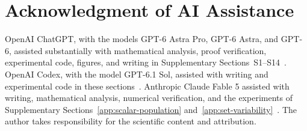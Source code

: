 \section*{Acknowledgment of AI Assistance}
OpenAI ChatGPT, with the models GPT-6 Astra Pro, GPT-6 Astra, and GPT-6,
assisted substantially with mathematical analysis, proof verification,
experimental code, figures, and writing in Supplementary Sections~S1--S14~\citep{openai_chatgpt}. OpenAI Codex, with the model
GPT-6.1 Sol, assisted with writing and experimental code in these sections~\citep{openai_codex}. Anthropic Claude Fable 5 assisted
with writing, mathematical analysis, numerical verification, and the
experiments of Supplementary
Sections~\ref{app:scalar-population} and~\ref{app:set-variability}~\citep{anthropic_claude_fable}.
The author takes responsibility for the scientific content and
attribution.



